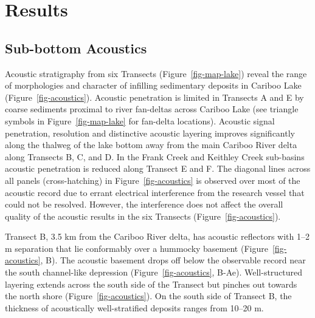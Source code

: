 \documentclass[
  letterpaper,
  DIV=11,
  numbers=noendperiod]{scrartcl}
\begin{document}
\hypertarget{results}{%
\section{Results}\label{results}}

\hypertarget{sub-bottom-acoustics}{%
\subsection{Sub-bottom Acoustics}\label{sub-bottom-acoustics}}

Acoustic stratigraphy from six Transects (Figure~\ref{fig-map-lake})
reveal the range of morphologies and character of infilling sedimentary
deposits in Cariboo Lake (Figure~\ref{fig-acoustics}). Acoustic
penetration is limited in Transects A and E by coarse sediments proximal
to river fan-deltas across Cariboo Lake (see triangle symbols in
Figure~\ref{fig-map-lake} for fan-delta locations). Acoustic signal
penetration, resolution and distinctive acoustic layering improves
significantly along the thalweg of the lake bottom away from the main
Cariboo River delta along Transects B, C, and D. In the Frank Creek and
Keithley Creek sub-basins acoustic penetration is reduced along Transect
E and F. The diagonal lines across all panels (cross-hatching) in
Figure~\ref{fig-acoustics} is observed over most of the acoustic record
due to errant electrical interference from the research vessel that
could not be resolved. However, the interference does not affect the
overall quality of the acoustic results in the six Transects
(Figure~\ref{fig-acoustics}).

Transect B, 3.5 km from the Cariboo River delta, has acoustic reflectors
with 1--2 m separation that lie conformably over a hummocky basement
(Figure~\ref{fig-acoustics}, B). The acoustic basement drops off below
the observable record near the south channel-like depression
(Figure~\ref{fig-acoustics}, B-Ae). Well-structured layering extends
across the south side of the Transect but pinches out towards the north
shore (Figure~\ref{fig-acoustics}). On the south side of Transect B, the
thickness of acoustically well-stratified deposits ranges from 10--20 m.
\end{document}

